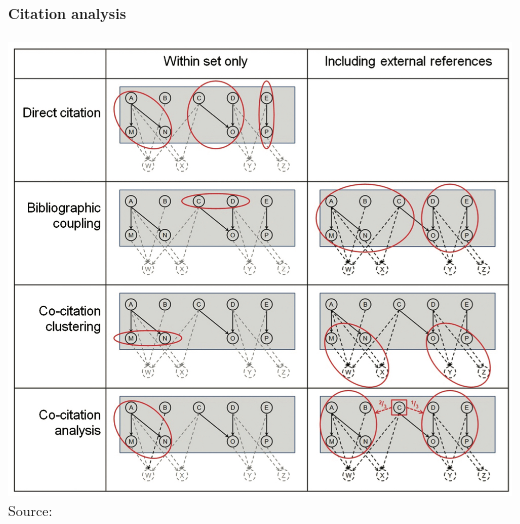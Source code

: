 \documentclass[8pt]{beamer}
\begin{document}

\begin{frame}
\frametitle{\insertsection}
\framesubtitle{Citation analysis}
\centering
\includegraphics[height=0.8\textheight]{citation}\\
\tiny{Source: \cite{Boyack2010}}
\end{frame}

%
%
%
%
%
\end{document}
